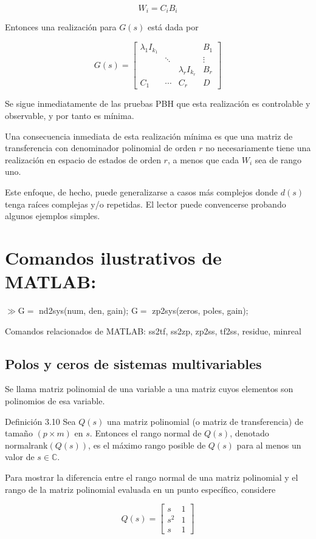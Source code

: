 \documentclass[11pt]{article}
\begin{document}
$$
W_{i}=C_{i} B_{i}
$$

Entonces una realización para $G(s)$ está dada por

$$
G(s)=\left[\begin{array}{ccc|c}
\lambda_{1} I_{k_{1}} & & & B_{1} \\
& \ddots & & \vdots \\
& & \lambda_{r} I_{k_{r}} & B_{r} \\
\hline C_{1} & \cdots & C_{r} & D
\end{array}\right]
$$

Se sigue inmediatamente de las pruebas PBH que esta realización es controlable y observable, y por tanto es mínima.

Una consecuencia inmediata de esta realización mínima es que una matriz de transferencia con denominador polinomial de orden $r$ no necesariamente tiene una realización en espacio de estados de orden $r$, a menos que cada $W_{i}$ sea de rango uno.

Este enfoque, de hecho, puede generalizarse a casos más complejos donde $d(s)$ tenga raíces complejas y/o repetidas. El lector puede convencerse probando algunos ejemplos simples.

\section*{Comandos ilustrativos de MATLAB:}
$\gg \mathrm{G}=$ nd2sys(num, den, gain); $\mathrm{G}=$ zp2sys(zeros, poles, gain);

Comandos relacionados de MATLAB: ss2tf, ss2zp, zp2ss, tf2ss, residue, minreal

\subsection*{Polos y ceros de sistemas multivariables}
Se llama matriz polinomial de una variable a una matriz cuyos elementos son polinomios de esa variable.

Definición 3.10 Sea $Q(s)$ una matriz polinomial (o matriz de transferencia) de tamaño $(p \times m)$ en $s$. Entonces el rango normal de $Q(s)$, denotado normalrank$(Q(s))$, es el máximo rango posible de $Q(s)$ para al menos un valor de $s \in \mathbb{C}$.

Para mostrar la diferencia entre el rango normal de una matriz polinomial y el rango de la matriz polinomial evaluada en un punto específico, considere

$$
Q(s)=\left[\begin{array}{cc}
s & 1 \\
s^{2} & 1 \\
s & 1
\end{array}\right]
$$
\end{document}
